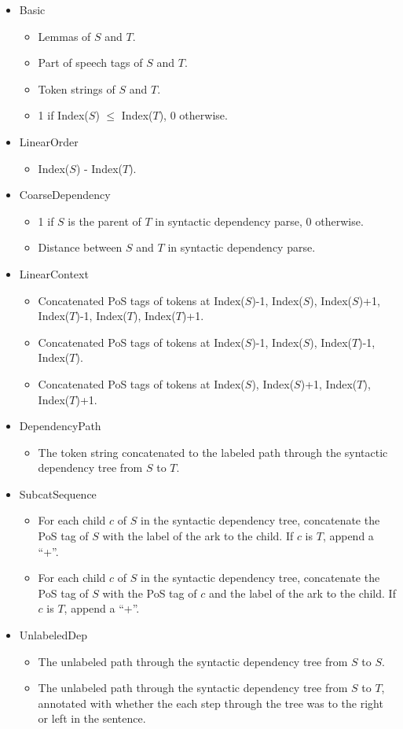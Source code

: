 \documentclass[11pt]{article}
\begin{document}
\begin{itemize}
\item Basic
\begin{itemize}
\item Lemmas of $S$ and $T$.
\item Part of speech tags of $S$ and $T$.
\item Token strings of $S$ and $T$.
\item 1 if Index($S$) $\le$ Index($T$), 0 otherwise.
\end{itemize}
\item LinearOrder
\begin{itemize}
\item Index($S$) - Index($T$).
\end{itemize}
\item CoarseDependency
\begin{itemize}
\item 1 if $S$ is the parent of $T$ in syntactic dependency parse, 0 otherwise.
\item Distance between $S$ and $T$ in syntactic dependency parse.
\end{itemize}
\item LinearContext
\begin{itemize}
\item Concatenated PoS tags of tokens at Index($S$)-1, Index($S$), Index($S$)+1, Index($T$)-1, Index($T$), Index($T$)+1.
\item Concatenated PoS tags of tokens at Index($S$)-1, Index($S$), Index($T$)-1, Index($T$).
\item Concatenated PoS tags of tokens at Index($S$), Index($S$)+1, Index($T$), Index($T$)+1.
\end{itemize}
\item DependencyPath
\begin{itemize}
\item The token string concatenated to the labeled path through the syntactic dependency tree from $S$ to $T$.
\end{itemize}
\item SubcatSequence
\begin{itemize}
\item For each child $c$ of $S$ in the syntactic dependency tree, concatenate the PoS tag of $S$ with the label of the ark to the child. If $c$ is $T$, append a ``+''.
\item For each child $c$ of $S$ in the syntactic dependency tree, concatenate the PoS tag of $S$ with the PoS tag of $c$ and the label of the ark to the child. If $c$ is $T$, append a ``+''.
\end{itemize}
\item UnlabeledDep
\begin{itemize}
\item The unlabeled path through the syntactic dependency tree from $S$ to $S$. 
\item The unlabeled path through the syntactic dependency tree from $S$ to $T$, annotated with whether the each step through the tree was to the right or left in the sentence.
\end{itemize}
\end{itemize}
\end{document}
